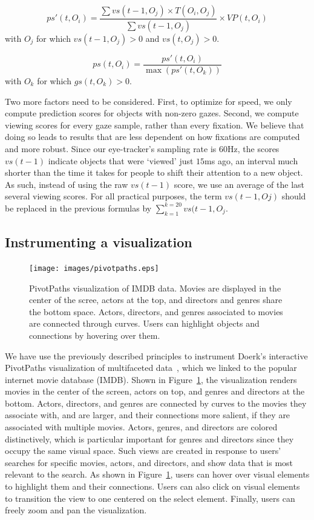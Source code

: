 \begin{equation}
ps'(t, O_i) = \frac{\sum{vs(t-1, O_j)} \times T(O_i,O_j)}{\sum{vs(t-1, O_j)}} \times VP(t, O_i)
\label{eq:PSDash}
\end{equation}
with $O_j$ for which $vs(t-1, O_j) > 0$ and $vs(t, O_j) > 0$.

\begin{equation}
ps(t,O_i) = \frac{ps'(t, O_i)}{\max (ps'(t, O_k))}
\label{eq:PS}
\end{equation}
with $O_k$ for which $gs(t,O_k) >0$.

Two more factors need to be considered. First, to optimize for speed, we only compute prediction scores for objects with non-zero gazes. Second, we compute viewing scores for every gaze sample, rather than every fixation. We believe that doing so leads to results that are less dependent on how fixations are computed and more robust. Since our eye-tracker's sampling rate is $60$Hz, the scores $vs(t-1)$ indicate objects that were `viewed' just $15$ms ago, an interval much shorter than the time it takes for people to shift their attention to a new object. As such, instead of using the raw $vs(t-1)$ score, we use an average of the last several viewing scores. For all practical purposes, the term $vs(t-1,Oj)$ should be replaced in the previous formulas by $ \sum_{k=1}^{k=20}{vs(t-1, O_j}$.


\subsection{Instrumenting a visualization}

\begin{figure}[htb]
  \centering
  \texttt{[image: images/pivotpaths.eps]}
  \caption{PivotPaths visualization of IMDB data. Movies are displayed in the center of the scree, actors at the top, and directors and genres share the bottom space. Actors, directors, and genres associated to movies are connected through curves. Users can highlight objects and connections by hovering over them.}
	\label{fig:pivotpaths}
\end{figure}
We have use the previously described principles to instrument Doerk's interactive PivotPaths visualization of multifaceted data~\cite{dork2012pivotpaths}, which we linked to the popular internet movie database (IMDB). Shown in Figure~\ref{fig:pivotpaths}, the visualization renders movies in the center of the screen, actors on top, and genres and directors at the bottom. Actors, directors, and genres are connected by curves to the movies they associate with, and are larger, and their connections more salient, if they are associated with multiple movies. Actors, genres, and directors are colored distinctively, which is particular important for genres and directors since they occupy the same visual space. Such views are created in response to users' searches for specific movies, actors, and directors, and show data that is most relevant to the search. As shown in Figure~\ref{fig:pivotpaths}, users can hover over visual elements to highlight them and their connections. Users can also click on visual elements to transition the view to one centered on the select element. Finally, users can freely zoom and pan the visualization. 

